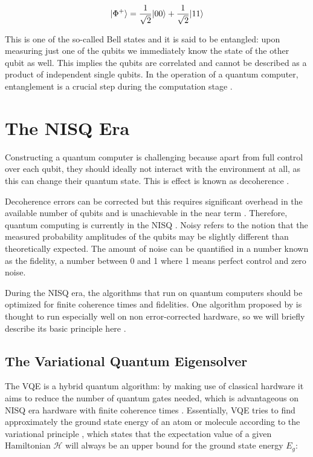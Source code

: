 \begin{equation}\label{eq:Entangled}
	\lvert\Phi^+\rangle = \frac{1}{\sqrt{2}} \lvert00\rangle+ \frac{1}{\sqrt{2}} \lvert11\rangle
\end{equation}

This is one of the so-called Bell states \cite{Nielsen2011} and it is said to be entangled: upon measuring just one of the qubits we immediately know the state of the other qubit as well. This implies the qubits are correlated and cannot be described as a product of independent single qubits. In the operation of a quantum computer, entanglement is a crucial step during the computation stage \cite{Henriet2020}. 

\section{The NISQ Era}

Constructing a quantum computer is challenging because apart from full control over each qubit, they should ideally not interact with the environment at all, as this can change their quantum state. This is effect is known as decoherence \cite{DiVincenzo2000}.

Decoherence errors can be corrected but this requires significant overhead in the available number of qubits and is unachievable in the near term \cite{Peres1985,Ladd2010}. Therefore, quantum computing is currently in the \ac{NISQ} \cite{Preskill2018}. Noisy refers to the notion that the measured probability amplitudes of the qubits may be slightly different than theoretically expected. The amount of noise can be quantified in a number known as the fidelity, a number between 0 and 1 where 1 means perfect control and zero noise. 

During the \ac{NISQ} era, the algorithms that run on quantum computers should be optimized for finite coherence times and fidelities. One algorithm proposed by \cite{Peruzzo2014} is thought to run especially well on non error-corrected hardware, so we will briefly describe its basic principle here \cite{McClean2016}. 

\subsection{The Variational Quantum Eigensolver}

The \ac{VQE} is a hybrid quantum algorithm: by making use of classical hardware it aims to reduce the number of quantum gates needed, which is advantageous on NISQ era hardware with finite coherence times \cite{McClean2016}. Essentially, \ac{VQE} tries to find approximately the ground state energy of an atom or molecule according to the variational principle \cite{Griffiths2004}, which states that the expectation value of a given Hamiltonian $\mathcal{H}$ will always be an upper bound for the ground state energy $E_g$:

